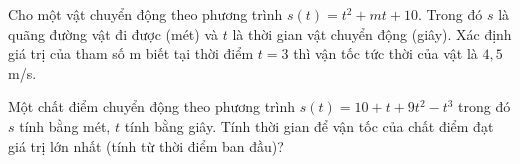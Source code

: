 \begin{ex}%
	Cho một vật chuyển động theo phương trình $s(t)=t^2+mt+10$. Trong đó $ s $ là quãng đường vật đi được (mét) và $ t $ là thời gian vật chuyển động (giây). Xác định giá trị của tham số m biết tại thời điểm $t=3$ thì vận tốc  tức thời của vật là $ 4{,}5 $ m/s.
\end{ex}

\begin{ex}%
	Một chất điểm chuyển  động theo phương trình $s(t)=10+t+9t^2-t^3$ trong đó $s$ tính bằng mét, $t$ tính bằng giây. Tính thời gian để vận tốc của chất điểm đạt giá trị lớn nhất (tính từ thời điểm ban đầu)?
\end{ex}

